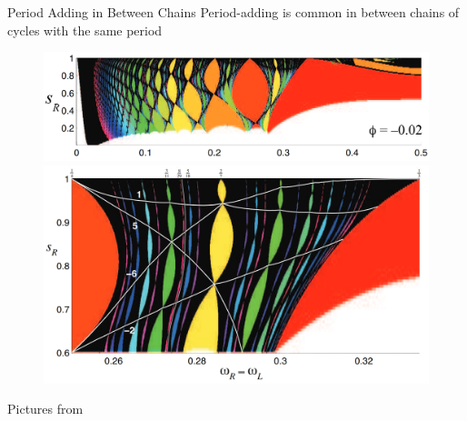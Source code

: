 
\begin{frame}{Period Adding in Between Chains}
	\vspace{-1em}
	Period-adding is common in between chains of cycles with the same period
	\begin{figure}
		\includegraphics[width=.5 \textwidth]{Figs/tounge_adding.png}\\
		\includegraphics[width=.5 \textwidth]{Figs/tounge_adding_zoomed.png}
	\end{figure}
	\vspace{-2em}
	\begin{flushright}
		Pictures from \cite{simpson2010}
	\end{flushright}
\end{frame}
